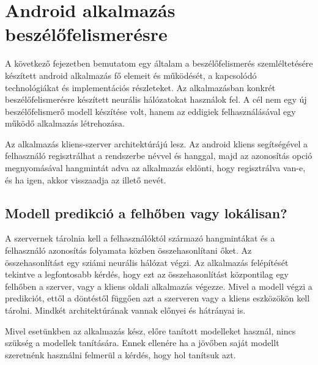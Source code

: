 \chapter{Android alkalmazás beszélőfelismerésre}

A következő fejezetben bemutatom egy általam a beszélőfelismerés szemléltetésére készített android alkalmazás fő elemeit és működését, a kapcsolódó technológiákat és implementációs részleteket. Az alkalmazásban konkrét beszélőfelismerésre készített neurális hálózatokat használok fel. A cél nem egy új beszélőfelismerő modell készítése volt, hanem az eddigiek felhasználásával egy működő alkalmazás létrehozása.

Az alkalmazás kliens-szerver architektúrájú lesz. Az android kliens segítségével a felhasználó regisztrálhat a rendszerbe névvel és hanggal, majd az azonosítás opció megnyomásával hangmintát adva az alkalmazás eldönti, hogy regisztrálva van-e, és ha igen, akkor visszaadja az illető nevét.

\section{Modell predikció a felhőben vagy lokálisan?}


A szervernek tárolnia kell a felhasználóktól származó hangmintákat és a felhasználó azonosítás folyamata közben összehasonlítani őket. Az összehasonlítást egy sziámi neurális hálózat végzi. Az alkalmazás felépítését tekintve a legfontosabb kérdés, hogy ezt az összehasonlítást központilag egy felhőben a szerver, vagy a kliens oldali alkalmazás végezze. Mivel a modell végzi a predikciót, ettől a döntéstől függően azt a szerveren vagy a kliens eszközökön kell tárolni. Mindkét architektúrának vannak előnyei és hátrányai is.

Mivel esetünkben az alkalmazás kész, előre tanított modelleket használ, nincs szükség a modellek tanítására. Ennek ellenére ha a jövőben saját modellt szeretnénk használni felmerül a kérdés, hogy hol tanítsuk azt.

